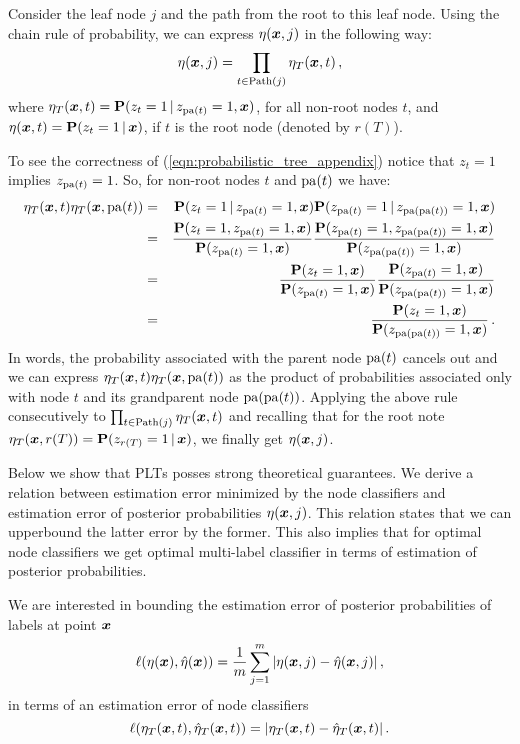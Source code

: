 \documentclass{article}
\newcommand{\prob}{\mathbf{P}}
\newcommand{\Algo}[1]{\textsc{#1}}
\begin{document}
Consider the leaf node $j$ and the path from the root to this leaf node. Using the chain rule of probability, we can express $\eta(\boldsymbol{x}, j)$ in the following way:
\begin{equation}
\eta(\boldsymbol{x}, j) = \prod_{t \in \mathrm{Path}(j)} \eta_T(\boldsymbol{x}, t)\,,
\label{eqn:probabilistic_tree_appendix}
\end{equation}
where $\eta_T(\bx, t) = \prob(z_t = 1 \given z_{\pa{t}} =1, \bx)$, for all non-root nodes $t$, and $\eta(\bx, t) = \prob(z_t = 1 \given \bx)$, if $t$ is the root node (denoted by $r(T)$). 

To see the correctness of (\ref{eqn:probabilistic_tree_appendix}) notice that $z_{t} = 1$ implies $z_{\mathrm{pa}(t)} = 1$. So, for non-root nodes $t$ and $\mathrm{pa}(t)$ we have:
\begin{eqnarray*}
\eta_T(\bx,t) \eta_T(\bx, \pa{t}) & = &  \prob(z_t = 1 \given z_{\pa{t}} =1, \bx)\prob(z_{\pa{t}} = 1 \given z_{\pa{\pa{t}}} =1, \bx)\\
& = & \frac{\prob(z_t = 1 , z_{\pa{t}} =1, \bx)}{\prob(z_{\pa{t}} =1, \bx)} \frac{\prob(z_{\pa{t}} = 1, z_{\pa{\pa{t}}} =1, \bx)}{\prob(z_{\pa{\pa{t}}} =1, \bx)} \\
& = & \frac{\prob(z_t = 1, \bx)}{\prob(z_{\pa{t}} =1, \bx)} \frac{\prob(z_{\pa{t}} = 1, \bx)}{\prob(z_{\pa{\pa{t}}} =1, \bx)} \\
& = & \frac{\prob(z_t = 1, \bx)}{\prob(z_{\pa{\pa{t}}} =1, \bx)} \,.
\end{eqnarray*}
In words, the probability associated with the parent node $\mathrm{pa}(t)$ cancels out and we can express $\eta_T(\boldsymbol{x},t) \eta_T(\boldsymbol{x}, \mathrm{pa}(t))$ as the product of probabilities associated only with node $t$ and its grandparent node $\mathrm{pa}(\mathrm{pa}(t))$. 
%
Applying the above rule consecutively to $\prod_{t \in \mathrm{Path}(j)} \eta_T(\boldsymbol{x}, t)$ and recalling that for the root note $\eta_T(\bx, r(T)) = \prob(z_{r(T)} = 1 \given \bx)$, we finally get $\eta(\boldsymbol{x}, j)$. 

Below we show that \Algo{PLT}s posses strong theoretical guarantees. We derive a relation between  estimation error minimized by the node classifiers and estimation error of posterior probabilities $\eta(\boldsymbol{x},j)$. This relation states that we can upperbound the latter error by the former. This also implies that for optimal node classifiers we get optimal multi-label classifier in terms of estimation of posterior probabilities.


We are interested in bounding the estimation error of posterior probabilities of labels at point $\boldsymbol{x}$
$$
\ell(\eta(\boldsymbol{x}),\hat{\eta}(\boldsymbol{x})) = \frac{1}{m} \sum_{j=1}^m |\eta(\boldsymbol{x}, j) - \hat{\eta}(\boldsymbol{x}, j)| \,,
$$
in terms of an estimation error of node classifiers
$$
\ell(\eta_T(\boldsymbol{x}, t), \hat{\eta}_T(\boldsymbol{x}, t)) = |\eta_T(\boldsymbol{x}, t) - \hat{\eta}_T(\boldsymbol{x}, t)  | \,.
$$
\end{document}
